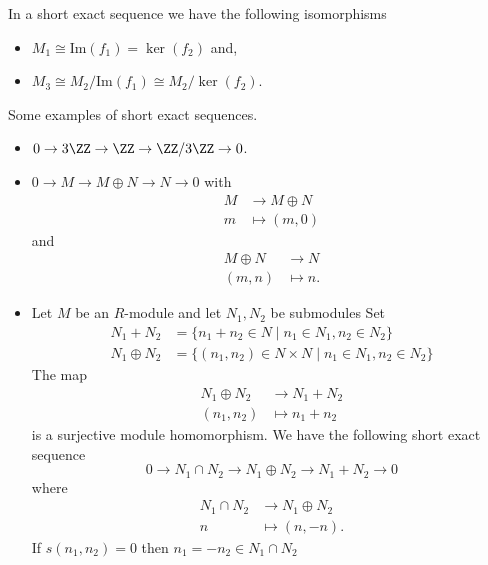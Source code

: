 \documentclass[12pt, a4paper]{article}
\begin{document}
\begin{mdcor}
    In a short exact sequence we have the following isomorphisms
    \begin{itemize}
        \item \(M_1 \cong \text{Im}(f_1)=\ker(f_2)\) and,
        \item \(M_3 \cong M_2/\text{Im}(f_1) \cong M_2/\ker(f_2)\).
    \end{itemize}
\end{mdcor}

\begin{mdexample}
    Some examples of short exact sequences.
    \begin{itemize}
        \item \(0 \to 3\ZZ \to \ZZ \to \ZZ/3\ZZ \to 0\).
        \item \(0\to M \to M\oplus N \to N \to 0\) with 
        \[\begin{aligned}
            M &\to M\oplus N \\
            m&\mapsto (m,0)
        \end{aligned}\]
        and 
        \[\begin{aligned}
            M \oplus N &\to N\\
            (m,n) &\mapsto n.
        \end{aligned}\]
        \item Let \( M \) be an \( R \)-module and let \( N_1, N_2 \) be submodules Set
        \[\begin{aligned}
        N_1 + N_2 &= \{ n_1 + n_2 \in N \mid n_1 \in N_1, n_2 \in N_2 \} \\
        N_1 \oplus N_2 &= \{ (n_1, n_2) \in N \times N \mid n_1 \in N_1, n_2 \in N_2 \}
        \end{aligned}\] 
        The map 
        \[\begin{aligned}
            N_1 \oplus N_2 &\to N_1 + N_2 \\
            (n_1,n_2) &\mapsto n_1+n_2
        \end{aligned}\]
        is a surjective module homomorphism. We have the following short exact sequence
        \[ 0 \rightarrow N_1 \cap N_2 \to N_1 \oplus N_2 \to N_1 + N_2 \rightarrow 0\]
        where 
        \[\begin{aligned}
            N_1 \cap N_2 &\to N_1\oplus N_2 \\
            n &\mapsto (n,-n).
        \end{aligned}\]
        If \( s(n_1, n_2) = 0 \) then \( n_1 = -n_2 \in N_1 \cap N_2 \)
    \end{itemize}
\end{mdexample}
\end{document}
